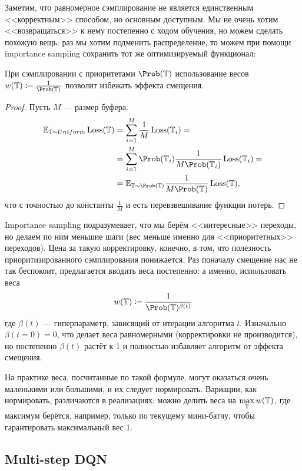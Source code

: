 Заметим, что равномерное сэмплирование не является единственным <<корректным>> способом, но основным доступным. Мы не очень хотим <<возвращаться>> к нему постепенно с ходом обучения, но можем сделать похожую вещь: раз мы хотим подменить распределение, то можем при помощи importance sampling сохранить тот же оптимизируемый функционал:

\begin{theorem}
При сэмплировании с приоритетами $\Prob( \T )$ использование весов $w(\T) \coloneqq \frac{1}{\Prob (\T )}$ позволит избежать эффекта смещения.
\begin{proof} Пусть $M$ --- размер буфера.
\begin{align*}
\mathbb{E}_{\T \sim \mathop{Uniform}} \Loss(\T ) &= \sum_{i=1}^M \frac{1}{M} \Loss(\T_i) = \\ 
&= \sum_{i=1}^M \Prob (\T_i) \frac{1}{M\Prob (\T_i)} \Loss(\T_i) = \\
&= \mathbb{E}_{\T \sim \Prob (\T)} \frac{1}{M\Prob (\T )} \Loss(\T),
\end{align*}
что с точностью до константы $\frac{1}{M}$ и есть перевзвешивание функции потерь.
\end{proof}
\end{theorem}

Importance sampling подразумевает, что мы берём <<интересные>> переходы, но делаем по ним меньшие шаги (вес меньше именно для <<приоритетных>> переходов). Цена за такую корректировку, конечно, в том, что полезность приоритизированного сэмплирования понижается. Раз поначалу смещение нас не так беспокоит, предлагается вводить веса постепенно: а именно, использовать веса
$$w(\T) \coloneqq \frac{1}{\Prob (\T )^{\beta(t)}}$$
где $\beta(t)$ --- гиперпараметр, зависящий от итерации алгоритма $t$. Изначально $\beta(t=0) = 0$, что делает веса равномерными (корректировки не производится), но постепенно $\beta(t)$ растёт к 1 и полностью избавляет алгоритм от эффекта смещения.

\begin{remark}
На практике веса, посчитанные по такой формуле, могут оказаться очень маленькими или большими, и их следует нормировать. Вариации, как нормировать, различаются в реализациях: можно делить веса на $\max\limits_{\mathbb{T}} w(\mathbb{T})$, где максимум берётся, например, только по текущему мини-батчу, чтобы гарантировать максимальный вес 1.
\end{remark}

\subsection{Multi-step DQN}\label{subsec:multistepdqn}


